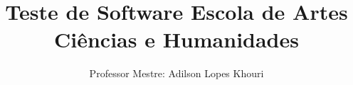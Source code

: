 \documentclass[compress, hyperref={pdfpagelayout=SinglePage}]{beamer}
\title[SIN5022]{Teste de Software Escola de Artes Ciências e Humanidades}
\author{Professor Mestre: Adilson Lopes Khouri}
\begin{document}
	\begin{frame}
		\titlepage
	\end{frame}
	
	
	
	
	
	
	
	

	
	
	

	

	
\end{document}
